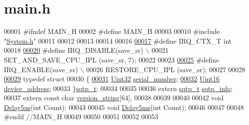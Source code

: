 \hypertarget{a00033_source}{\section{main.\+h}
\label{a00033_source}
}

\begin{DoxyCode}
00001 \textcolor{preprocessor}{#ifndef MAIN\_H}
00002 \textcolor{preprocessor}{#define MAIN\_H}
00003 
00010 \textcolor{preprocessor}{#include "\hyperlink{a00072}{System.h}"}
00011 
00012 
00013 
00014 
00016 
\hypertarget{a00033_source_l00017}{}\hyperlink{a00033_a6d4f0a7397640f5b011ca9c39d47dc72}{00017} \textcolor{preprocessor}{#define IRQ\_CTX\_T  int}
00018 
\hypertarget{a00033_source_l00020}{}\hyperlink{a00033_a357168bbe78739811cdb7b5576714ca6}{00020} \textcolor{preprocessor}{#define IRQ\_DISABLE(save\_sr) \(\backslash\)}
00021 \textcolor{preprocessor}{    SET\_AND\_SAVE\_CPU\_IPL (save\_sr, 7);}
00022 
00023 
\hypertarget{a00033_source_l00025}{}\hyperlink{a00033_abc8e0f43382f8b0fdf60d35a93c20c57}{00025} \textcolor{preprocessor}{#define IRQ\_ENABLE(save\_sr)   \(\backslash\)}
00026 \textcolor{preprocessor}{    RESTORE\_CPU\_IPL (save\_sr);}
00027 
00028 
\hypertarget{a00033_source_l00029}{}\hyperlink{a00033}{00029} \textcolor{keyword}{typedef} \textcolor{keyword}{struct}
00030 \{
\hypertarget{a00033_source_l00031}{}\hyperlink{a00033_a728c5fe7bc16e168a8f93fba18ee5561}{00031}     \hyperlink{a00072_aba99025e657f892beb7ff31cecf64653}{Uint32}  \hyperlink{a00033_a728c5fe7bc16e168a8f93fba18ee5561}{serial\_number};
\hypertarget{a00033_source_l00032}{}\hyperlink{a00033_a4ad37aef4f33d79d64179f326666ef07}{00032}     \hyperlink{a00072_a59a9f6be4562c327cbfb4f7e8e18f08b}{Uint16}  \hyperlink{a00033_a4ad37aef4f33d79d64179f326666ef07}{device\_address};
00033 \}\hyperlink{a00033_d3/d95/a00779}{sqtp\_t};
00034 
00035 
00036 \textcolor{keyword}{extern} \hyperlink{a00033_d3/d95/a00779}{sqtp\_t}  \hyperlink{a00033_a4e1e8b365cce7a6d497671681eb5823c}{sqtp\_info};
00037 \textcolor{keyword}{extern} \textcolor{keyword}{const} \textcolor{keywordtype}{char}  \hyperlink{a00033_a9913e6dccd88bd052d3e8e9d73da4ede}{version\_string}[64];
00038 
00039 
00040 
00042 \textcolor{keywordtype}{void} \hyperlink{a00033_a3b0017f6ec0e04a6435bba00fe325294}{Delay5us}(\textcolor{keywordtype}{int} Count);
00043 
00045 \textcolor{keywordtype}{void} \hyperlink{a00033_ac529343dfb6363f115d0f9213fbe4317}{Delay5ms}(\textcolor{keywordtype}{int} Count);
00046 
00047 
00048 \textcolor{preprocessor}{#endif //MAIN\_H}
00049 
00050 
00051 
00052 
00053 
\end{DoxyCode}
